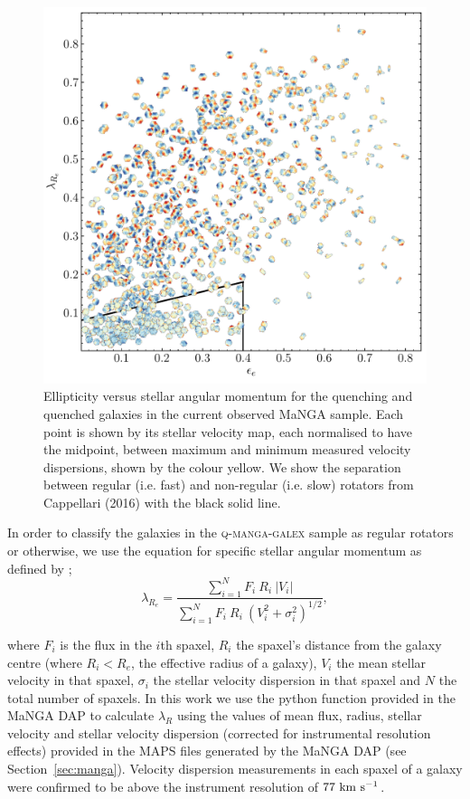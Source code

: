 \documentclass[useAMS,usenatbib]{mn2e}
\begin{document}
\begin{figure}
\centering
\includegraphics[width=\textwidth]{../figures/nonSF_FR_SR_sample_orig_cmap_vel_maps.pdf}
\caption{Ellipticity versus stellar angular momentum for the quenching and quenched galaxies in the current observed MaNGA sample. Each point is shown by its stellar velocity map, each normalised to have the midpoint, between maximum and minimum measured velocity dispersions, shown by the colour yellow. We show the separation between regular (i.e. fast) and non-regular (i.e. slow) rotators from Cappellari (2016) with the black solid line.}
\label{fig:evsl}
\end{figure}


In order to classify the galaxies in the \textsc{q-manga-galex} sample as regular rotators or otherwise, we use the equation for specific stellar angular momentum as defined by \cite{emsellem07, emsellem11};
\begin{equation}
\lambda_{R_{e}} = \frac{\sum_{i=1}^{N} F_i\ R_i\ |V_i|}{\sum_{i=1}^{N} F_i\ R_i\ (V_i^2 + \sigma_i^2)^{1/2}},
\end{equation}	

where $F_i$ is the flux in the $i$th spaxel, $R_i$ the spaxel's distance from the galaxy centre (where $R_i < R_e$, the effective radius of a galaxy), $V_i$ the mean stellar velocity in that spaxel, $\sigma_i$ the stellar velocity dispersion in that spaxel and $N$ the total number of spaxels. In this work we use the python function provided in the MaNGA DAP to calculate $\lambda_R$ using the values of mean flux, radius, stellar velocity and stellar velocity dispersion (corrected for instrumental resolution effects) provided in the MAPS files generated by the MaNGA DAP (see Section~\ref{sec:manga}). Velocity dispersion measurements in each spaxel of a galaxy were confirmed to be above the instrument resolution of $77~\rm{km}~\rm{s}^{-1}$.
\end{document}
